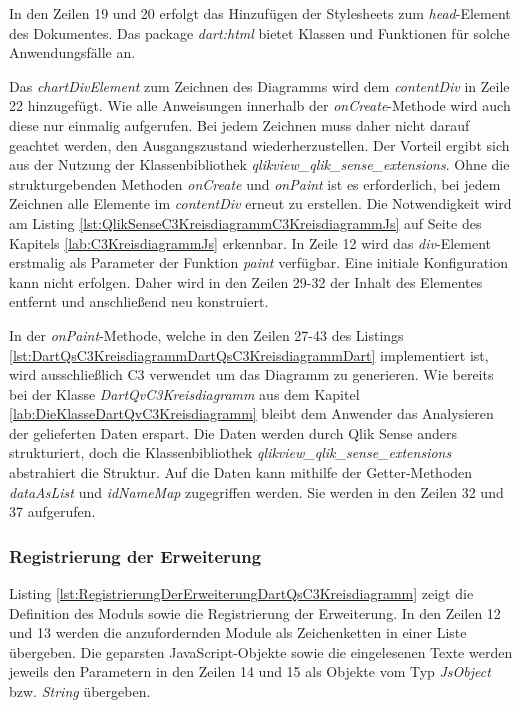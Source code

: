 In den Zeilen 19 und 20 erfolgt das Hinzufügen der Stylesheets zum \textit{head}-Element des Dokumentes. Das package \textit{dart:html} bietet Klassen und Funktionen für solche Anwendungsfälle an. 

Das \textit{chartDivElement} zum Zeichnen des Diagramms wird dem \textit{contentDiv} in Zeile 22 hinzugefügt. Wie alle Anweisungen innerhalb der \textit{onCreate}-Methode wird auch diese nur einmalig aufgerufen. Bei jedem Zeichnen muss daher nicht darauf geachtet werden, den Ausgangszustand wiederherzustellen. Der Vorteil ergibt sich aus der Nutzung der Klassen\-bibliothek \textit{qlikview\_qlik\_sense\_extensions}. Ohne die strukturgebenden Methoden \textit{onCreate} und \textit{onPaint} ist es erforderlich, bei jedem Zeichnen alle Elemente im \textit{contentDiv} erneut zu erstellen. Die Notwendig\-keit wird am Listing \ref{lst:QlikSenseC3KreisdiagrammC3KreisdiagrammJs} auf Seite \pageref{lst:QlikSenseC3KreisdiagrammC3KreisdiagrammJs} des Kapitels \ref{lab:C3KreisdiagrammJs} erkennbar. In Zeile 12 wird das \textit{div}-Element erstmalig als Parameter der Funktion \textit{paint} verfügbar. Eine initiale Konfiguration kann nicht erfolgen. Daher wird in den Zeilen 29-32 der Inhalt des Elementes entfernt und anschließend neu konstruiert.

In der \textit{onPaint}-Methode, welche in den Zeilen 27-43 des Listings \ref{lst:DartQsC3KreisdiagrammDartQsC3KreisdiagrammDart} implementiert ist, wird ausschließlich C3 verwendet um das Diagramm zu generieren. Wie bereits bei der Klasse \textit{DartQvC3Kreisdiagramm} aus dem Kapitel \ref{lab:DieKlasseDartQvC3Kreisdiagramm} bleibt dem Anwender das Analysieren der gelieferten Daten erspart. Die Daten werden durch Qlik Sense anders strukturiert, doch die Klassen\-bibliothek \textit{qlikview\_qlik\_sense\_extensions} abstrahiert die Struktur. Auf die Daten kann mithilfe der Getter-Methoden \textit{dataAsList} und \textit{idNameMap} zugegriffen werden. Sie werden in den Zeilen 32 und 37 aufgerufen. 


\subsubsection{Registrierung der Erweiterung}

Listing \ref{lst:RegistrierungDerErweiterungDartQsC3Kreisdiagramm} zeigt die Definition des Moduls sowie die Registrierung der Erweiterung. In den Zeilen 12 und 13 werden die anzufordernden Module als Zeichenketten in einer Liste übergeben. Die geparsten JavaScript-Objekte sowie die eingelesenen Texte werden jeweils den Parametern in den Zeilen 14 und 15 als Objekte vom Typ \textit{JsObject} bzw. \textit{String} übergeben.

